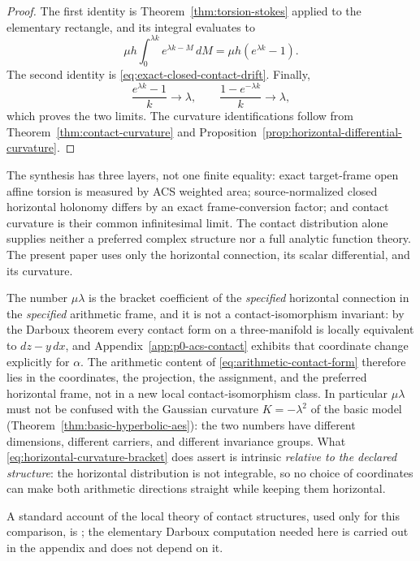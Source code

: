 \begin{proof}
The first identity is Theorem~\ref{thm:torsion-stokes} applied to the elementary
rectangle, and its integral evaluates to
\[
    \mu h\int_0^{\lambda k}e^{\lambda k-M}\,dM
       =\mu h(e^{\lambda k}-1).
\]
The second identity is \eqref{eq:exact-closed-contact-drift}.  Finally,
\[
    \frac{e^{\lambda k}-1}{k}\longrightarrow\lambda,
    \qquad
    \frac{1-e^{-\lambda k}}{k}\longrightarrow\lambda,
\]
which proves the two limits.  The curvature identifications follow from
Theorem~\ref{thm:contact-curvature} and
Proposition~\ref{prop:horizontal-differential-curvature}.
\end{proof}

The synthesis has three layers, not one finite equality: exact target-frame open
affine torsion is measured by ACS weighted area; source-normalized closed horizontal
holonomy differs by an exact frame-conversion factor; and contact curvature is their common
infinitesimal limit.  The contact distribution alone supplies neither a
preferred complex structure nor a full analytic function theory.  The present
paper uses only the horizontal connection, its scalar differential, and its
curvature.

\begin{remark}
\label{rem:p0-curvature-not-contact-invariant}
The number $\mu\lambda$ is the bracket coefficient of the \emph{specified} horizontal
connection in the \emph{specified} arithmetic frame, and it is not a
contact-isomorphism invariant: by the Darboux theorem every contact form on a
three-manifold is locally equivalent to $dz-y\,dx$, and Appendix~\ref{app:p0-acs-contact}
exhibits that coordinate change explicitly for $\alpha$.  The arithmetic content
of \eqref{eq:arithmetic-contact-form} therefore lies in the coordinates, the
projection, the assignment, and the preferred horizontal frame, not in a new
local contact-isomorphism class.  In particular $\mu\lambda$ must not be
confused with the Gaussian curvature $K=-\lambda^2$ of the basic model
(Theorem~\ref{thm:basic-hyperbolic-aes}): the two numbers have different
dimensions, different carriers, and different invariance groups.  What
\eqref{eq:horizontal-curvature-bracket} does assert is intrinsic \emph{relative to
the declared structure}: the horizontal distribution is not integrable, so no
choice of coordinates can make both arithmetic directions straight while
keeping them horizontal.

A standard account of the local theory of contact structures, used only for this
comparison, is \cite{Etnyre2001IntroductoryLectures}; the elementary Darboux
computation needed here is carried out in the appendix and does not depend on
it.
\end{remark}

